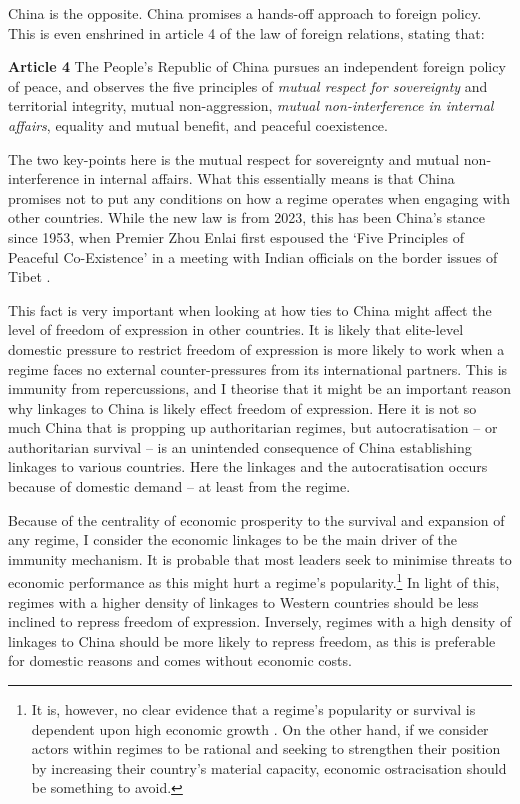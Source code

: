 China is the opposite. China promises a hands-off approach to foreign policy. This is even enshrined in article 4 of the law of foreign relations, stating that:
\begin{displayquote}
\textbf{Article 4} The People's Republic of China pursues an independent foreign policy of peace, and observes the five principles of \textit{mutual respect for sovereignty} and territorial integrity, mutual non-aggression, \textit{mutual non-interference in internal affairs}, equality and mutual benefit, and peaceful coexistence. \citep[emphases are my own]{xinhua_law_2023}
\end{displayquote}
The two key-points here is the mutual respect for sovereignty and mutual non-interference in internal affairs. What this essentially means is that China promises not to put any conditions on how a regime operates when engaging with other countries. While the new law is from 2023, this has been China's stance since 1953, when Premier Zhou Enlai first espoused the `Five Principles of Peaceful Co-Existence' in a meeting with Indian officials on the border issues of Tibet \citep{zhonghua_renmin_gongheguo_jiaowenbu_ministry_of_foreign_affairs_of_the_peoples_republic_of_china_zhongguo_2000}.

This fact is very important when looking at how ties to China might affect the level of freedom of expression in other countries. It is likely that elite-level domestic pressure to restrict freedom of expression is more likely to work when a regime faces no external counter-pressures from its international partners. This is immunity from repercussions, and I theorise that it might be an important reason why linkages to China is likely effect freedom of expression. Here it is not so much China that is propping up authoritarian regimes, but autocratisation -- or authoritarian survival -- is an unintended consequence of China establishing linkages to various countries. Here the linkages and the autocratisation occurs because of domestic demand -- at least from the regime.

Because of the centrality of economic prosperity to the survival and expansion of any regime, I consider the economic linkages to be the main driver of the immunity mechanism. It is probable that most leaders seek to minimise threats to economic performance as this might hurt a regime's popularity.\footnote{It is, however, no clear evidence that a regime's popularity or survival is dependent upon high economic growth \citep{chu_sources_2013, stockemer_economic_2020}. On the other hand, if we consider actors within regimes to be rational and seeking to strengthen their position by increasing their country's material capacity, economic ostracisation should be something to avoid.} In light of this, regimes with a higher density of linkages to Western countries should be less inclined to repress freedom of expression. Inversely, regimes with a high density of linkages to China should be more likely to repress freedom, as this is preferable for domestic reasons and comes without economic costs. 

